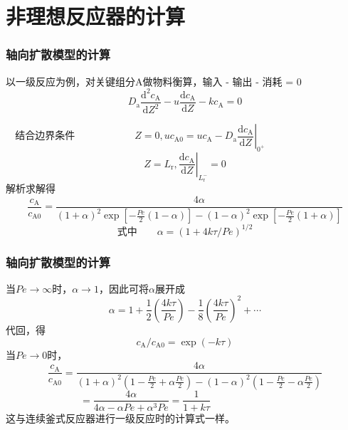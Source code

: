\section{非理想反应器的计算}


\begin{frame}
    \frametitle{轴向扩散模型的计算}

    以一级反应为例，对关键组分A做物料衡算，输入 - 输出 - 消耗 = 0
    \[
        D_{\mathrm{a}} \frac{\mathrm{d}^{2} c_{\mathrm{A}}}{\mathrm{d} Z^{2}}-u \frac{\mathrm{d} c_{\mathrm{A}}}{\mathrm{d} Z}-k c_{\mathrm{A}}=0
    \]
    
    \[
       \text{结合边界条件} \qquad \qquad \qquad  Z=0, u c_{\mathrm{A} 0}=u c_{\mathrm{A}}-\left.D_{\mathrm{a}} \frac{\mathrm{d} c_{\mathrm{A}}}{\mathrm{d} Z}\right|_{0^{+}} \qquad \qquad \qquad \qquad \quad
    \]
    \[
        Z=L_{\mathrm{r}},\left.\frac{\mathrm{d} c_{\mathrm{A}}}{\mathrm{d} Z}\right|_{L_{\mathrm{r}}^{-}}=0
    \]
    解析求解得
    \[
        \frac{c_{\mathrm{A}}}{c_{\mathrm{A} 0}}=\frac{4 \alpha}{(1+\alpha)^{2} \exp \left[-\frac{P e}{2}(1-\alpha)\right]-(1-\alpha)^{2} \exp \left[-\frac{P e}{2}(1+\alpha)\right]}
    \]
    \[
        \text{式中} \qquad \alpha=(1+4 k \tau / P e)^{1 / 2}
    \]

\end{frame}


\begin{frame}
    \frametitle{轴向扩散模型的计算}

    当$Pe \to \infty$时，$\alpha \to 1$，因此可将$\alpha$展开成
    \[
        \alpha=1+\frac{1}{2}\left(\frac{4 k \tau}{P e}\right)-\frac{1}{8}\left(\frac{4 k \tau}{P e}\right)^{2}+\cdots
    \]
    代回，得
    \[
        c_{\mathrm{A}} / c_{\mathrm{A} 0}=\exp (-k \tau)
    \]
    当$Pe \to 0$时，
    \[
        \frac{c_{\mathrm{A}}}{c_{\mathrm{A} 0}}=\frac{4 \alpha}{(1+\alpha)^{2}\left(1-\frac{P e}{2}+\alpha \frac{P e}{2}\right)-(1-\alpha)^{2}\left(1-\frac{P e}{2}-\alpha \frac{P e}{2}\right)}
    \]
    \[
        =\frac{4 \alpha}{4 \alpha-\alpha P e+\alpha^{3} P e}=\frac{1}{1+k \tau} \qquad \qquad \qquad \qquad
    \]
    这与连续釜式反应器进行一级反应时的计算式一样。

\end{frame}


